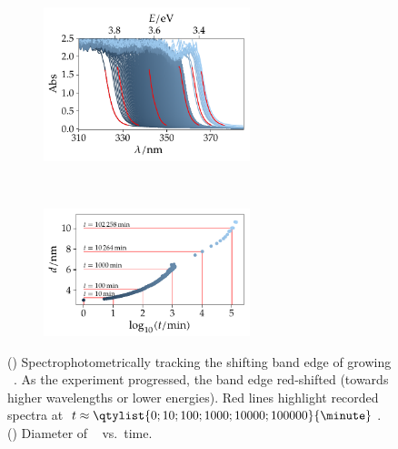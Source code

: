 \documentclass[webedition,openright,titles,swedish,english]{LuaUUThesis}\usepackage[]{graphicx}\usepackage[]{xcolor}
\newenvironment{knitrout}{}{} %
\newcommand{\vs}{vs.}
\newcommand{\versus}{\vs}
\begin{document}
\begin{figure}[tbp]
\centering
\begin{subfigure}[b]{0.48\textwidth}
\centering
%
\begin{knitrout}\scriptsize
{}\color{fgcolor}

{\centering \includegraphics[width=2.36in]{figure/0600-fig-abs-vs-wl-1} 

}


\end{knitrout}
\caption{}
\label{fig:6500-abs-vs-wavelength}
\end{subfigure}%
\,%
\begin{subfigure}[b]{0.48\textwidth}
\centering
%
\begin{knitrout}\scriptsize
{}\color{fgcolor}

{\centering \includegraphics[width=2.36in]{figure/0600-fig-diameter-vs-time-1} 

}


\end{knitrout}
\caption{}
\label{fig:6500-diameter-vs-time}
\end{subfigure}%
\caption[Growing ZnO QDs tracked spectrophotometrically]{%
   ()
   Spectrophotometrically tracking the shifting band edge of growing \zincox\ \protect{}.
   As the experiment progressed, the band edge red-shifted (towards higher wavelengths or lower energies).
   Red lines highlight recorded spectra at $t\approx\qtylist{0;10;100;1000;10000;100000}{\minute}$.
   ()
   Diameter of \zincox\ \protect{} \versus\ time.
}
\label{fig:6500-ZnO-QD-tracked}
\end{figure}
\end{document}
